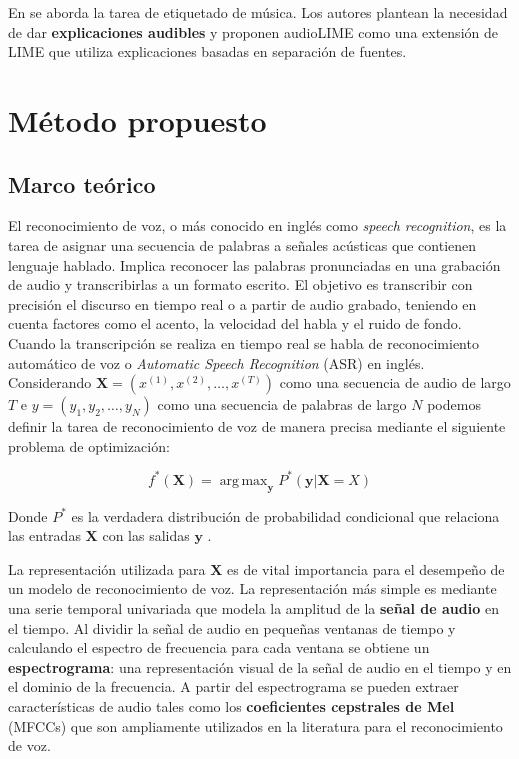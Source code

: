 \documentclass[conference]{IEEEtran}
\DeclareMathOperator*{\argmax}{arg\,max}
\begin{document}
En \cite{DBLP:journals/corr/abs-2008-00582} se aborda la tarea de etiquetado de música. Los autores plantean la necesidad de dar \textbf{explicaciones audibles} y proponen audioLIME como una extensión de LIME que utiliza explicaciones basadas en separación de fuentes.

\section{Método propuesto}

\subsection{Marco teórico}

El reconocimiento de voz, o más conocido en inglés como \textit{speech recognition}, es la tarea de asignar una secuencia de palabras a señales acústicas que contienen lenguaje hablado. 
Implica reconocer las palabras pronunciadas en una grabación de audio y transcribirlas a un formato escrito. El objetivo es transcribir con precisión el discurso en tiempo real o a partir de audio grabado, teniendo en cuenta factores como el acento, la velocidad del habla y el ruido de fondo.
Cuando la transcripción se realiza en tiempo real se habla de reconocimiento automático de voz o \textit{Automatic Speech Recognition} (ASR) en inglés. Considerando $\mathbf{X} = (x^{(1)}, x^{(2)} ,\dots, x^{(T)})$ como una secuencia de audio de largo $T$ e $y = (y_1, y_2, \dots, y_N)$ como una secuencia de palabras de largo $N$ podemos definir la tarea de reconocimiento de voz de manera precisa mediante el siguiente problema de optimización:

\begin{equation}
    f^\ast(\mathbf{X}) = \argmax_{\mathbf{y}} P^\ast(\mathbf{y}| \mathbf{X} = X)
\end{equation}

Donde $P^\ast$ es la verdadera distribución de probabilidad condicional que relaciona las entradas $\mathbf{X}$ con las salidas $\mathbf{y}$ \cite{Goodfellow-et-al-2016}.

La representación utilizada para $\mathbf{X}$ es de vital importancia para el desempeño de un modelo de reconocimiento de voz. La representación más simple es mediante una serie temporal univariada que modela la amplitud de la \textbf{señal de audio} en el tiempo. Al dividir la señal de audio en pequeñas ventanas de tiempo y calculando el espectro de frecuencia para cada ventana se obtiene un \textbf{espectrograma}: una representación visual de la señal de audio en el tiempo y en el dominio de la frecuencia. A partir del espectrograma se pueden extraer características de audio tales como los \textbf{coeficientes cepstrales de Mel} (MFCCs) que son ampliamente utilizados en la literatura para el reconocimiento de voz.
\end{document}
